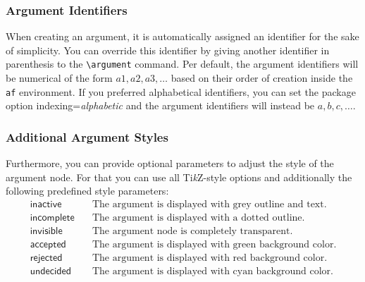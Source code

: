 \documentclass{article}
\newcommand{\tikzname}{Ti\emph{k}Z\xspace}
\begin{document}

\subsubsection{Argument Identifiers}
    When creating an argument, it is automatically assigned an identifier for the sake of simplicity.
    You can override this identifier by giving another identifier in parenthesis to the \verb|\argument| command.
    Per default, the argument identifiers will be numerical of the form $a1, a2, a3, \dots$ based on their order of creation inside the \texttt{af} environment.
    If you preferred alphabetical identifiers, you can set the package option \textsf{indexing}=\emph{alphabetic} and the argument identifiers will instead be $a, b, c, \dots$.

\subsubsection{Additional Argument Styles}
    Furthermore, you can provide optional parameters to adjust the style of the argument node.
    For that you can use all \tikzname-style options and additionally the following predefined style parameters:
    \begin{align*}
        \mathsf{inactive} &\quad \text{The argument is displayed with grey outline and text.}\\
        \mathsf{incomplete} &\quad \text{The argument is displayed with a dotted outline.}\\
        \mathsf{invisible} &\quad \text{The argument node is completely transparent.}\\
        \mathsf{accepted} &\quad \text{The argument is displayed with green background color.}\\
        \mathsf{rejected} &\quad \text{The argument is displayed with red background color.}\\
        \mathsf{undecided} &\quad \text{The argument is displayed with cyan background color.}\\
    \end{align*}
\end{document}
